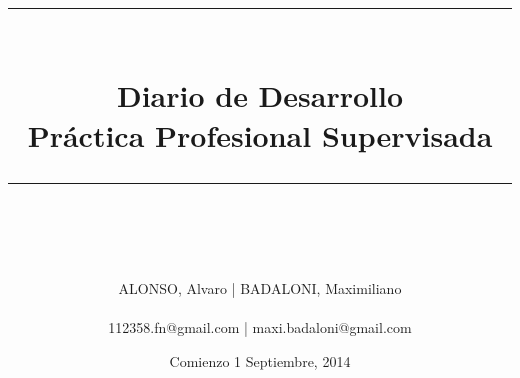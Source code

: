 \documentclass[idxtotoc,hyperref,openany]{labbook} %
\newcommand{\HRule}{\rule{\linewidth}{0.5mm}} %
\begin{document}

\frontmatter %
\title{
\begin{center}
\HRule \\[0.4cm]
{\Huge \bfseries Diario de Desarrollo \\[0.5cm] \Large Práctica Profesional Supervisada}\\[0.4cm] %
\HRule \\[1.5cm]
\end{center}
}
\author{\LARGE ALONSO, Alvaro | BADALONI, Maximiliano \\ \\ \Large 112358.fn@gmail.com | maxi.badaloni@gmail.com \\[2cm]} %
\date{Comienzo 1 Septiembre, 2014} %
\maketitle

\tableofcontents

\mainmatter %

%
% 
% 
% 
\end{document}
